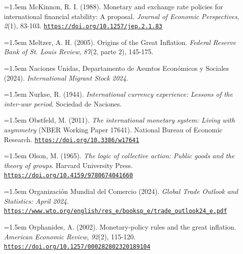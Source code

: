\documentclass[10pt,a4paper]{article}
\begin{document}
{\sloppy\noindent\hangindent=1.5em McKinnon, R. I. (1988). Monetary and exchange rate policies for international financial stability: A proposal. \textit{Journal of Economic Perspectives}, \textit{2}(1), 83-103. \href{https://doi.org/10.1257/jep.2.1.83}{\nolinkurl{https://doi.org/10.1257/jep.2.1.83}}\par}

{\sloppy\noindent\hangindent=1.5em Meltzer, A. H. (2005). Origins of the Great Inflation. \textit{Federal Reserve Bank of St. Louis Review}, \textit{87}(2, parte 2), 145-175.\par}

{\sloppy\noindent\hangindent=1.5em Naciones Unidas, Departamento de Asuntos Económicos y Sociales (2024). \textit{International Migrant Stock 2024}.\par}

{\sloppy\noindent\hangindent=1.5em Nurkse, R. (1944). \textit{International currency experience: Lessons of the inter-war period}. Sociedad de Naciones.\par}

{\sloppy\noindent\hangindent=1.5em Obstfeld, M. (2011). \textit{The international monetary system: Living with asymmetry} (NBER Working Paper 17641). National Bureau of Economic Research. \href{https://doi.org/10.3386/w17641}{\nolinkurl{https://doi.org/10.3386/w17641}}\par}

{\sloppy\noindent\hangindent=1.5em Olson, M. (1965). \textit{The logic of collective action: Public goods and the theory of groups}. Harvard University Press. \href{https://doi.org/10.4159/9780674041660}{\nolinkurl{https://doi.org/10.4159/9780674041660}}\par}

{\sloppy\noindent\hangindent=1.5em Organización Mundial del Comercio (2024). \textit{Global Trade Outlook and Statistics: April 2024}. \href{https://www.wto.org/english/res_e/booksp_e/trade_outlook24_e.pdf}{\nolinkurl{https://www.wto.org/english/res_e/booksp_e/trade_outlook24_e.pdf}}\par}

{\sloppy\noindent\hangindent=1.5em Orphanides, A. (2002). Monetary-policy rules and the great inflation. \textit{American Economic Review}, \textit{92}(2), 115-120. \href{https://doi.org/10.1257/000282802320189104}{\nolinkurl{https://doi.org/10.1257/000282802320189104}}\par}
\end{document}
